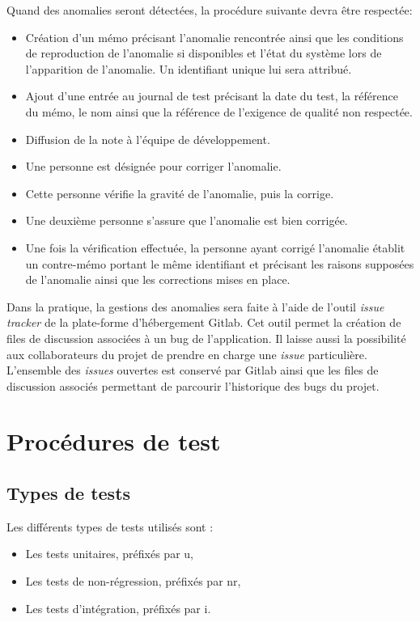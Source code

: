 \documentclass{../res/univ-projet}
\begin{document}
Quand des anomalies seront détectées, la procédure suivante devra être respectée:
  \begin{itemize}
   \item Création d'un mémo précisant l'anomalie rencontrée ainsi que les conditions de reproduction de l'anomalie si disponibles et l'état du système lors de l'apparition de l'anomalie.  
   Un identifiant unique lui sera attribué.
   \item Ajout d'une entrée au journal de test précisant la date du test, la référence du mémo, le nom ainsi que la référence de l'exigence de 
   qualité non respectée.
   \item Diffusion de la note à l'équipe de développement.
   \item Une personne est désignée pour corriger l'anomalie.
   \item Cette personne vérifie la gravité de l'anomalie, puis la corrige.
   \item Une deuxième personne s'assure que l'anomalie est bien corrigée.
   \item Une fois la vérification effectuée, la personne ayant corrigé l'anomalie établit un contre-mémo portant le même identifiant et précisant les raisons supposées 
   de l'anomalie ainsi que les corrections mises en place.
  \end{itemize}
  

  Dans la pratique, la gestions des anomalies sera faite à l'aide de l'outil \emph{issue tracker} de
  la plate-forme d'hébergement Gitlab. Cet outil permet la création de files de discussion associées à un bug
  de l'application. Il laisse aussi la possibilité aux collaborateurs du projet de prendre en charge 
  une \emph{issue} particulière. L'ensemble des \emph{issues} ouvertes est conservé par Gitlab ainsi
  que les files de discussion associés permettant de parcourir l'historique des bugs du projet.


\section{Procédures de test}

\subsection{Types de tests}

  Les différents types de tests utilisés sont :
  \begin{itemize}
   \item Les tests unitaires, préfixés par u,
   \item Les tests de non-régression, préfixés par nr,
   \item Les tests d'intégration, préfixés par i.
  \end{itemize}
  
\end{document}

